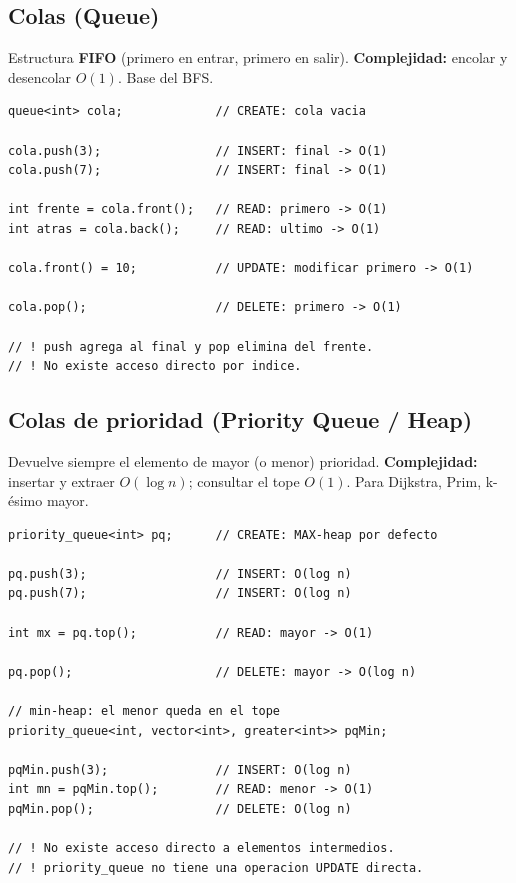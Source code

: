 \documentclass[10pt,a4paper,twocolumn]{article}
\begin{document}
\subsection{Colas (Queue)}

Estructura \textbf{FIFO} (primero en entrar, primero en salir).
\textbf{Complejidad:} encolar y desencolar $O(1)$. Base del BFS.

\begin{lstlisting}[style=cpp]
queue<int> cola;             // CREATE: cola vacia

cola.push(3);                // INSERT: final -> O(1)
cola.push(7);                // INSERT: final -> O(1)

int frente = cola.front();   // READ: primero -> O(1)
int atras = cola.back();     // READ: ultimo -> O(1)

cola.front() = 10;           // UPDATE: modificar primero -> O(1)

cola.pop();                  // DELETE: primero -> O(1)

// ! push agrega al final y pop elimina del frente.
// ! No existe acceso directo por indice.
\end{lstlisting}


\subsection{Colas de prioridad (Priority Queue / Heap)}

Devuelve siempre el elemento de mayor (o menor) prioridad.
\textbf{Complejidad:} insertar y extraer $O(\log n)$; consultar el tope
$O(1)$. Para Dijkstra, Prim, k-ésimo mayor.

\begin{lstlisting}[style=cpp]
priority_queue<int> pq;      // CREATE: MAX-heap por defecto

pq.push(3);                  // INSERT: O(log n)
pq.push(7);                  // INSERT: O(log n)

int mx = pq.top();           // READ: mayor -> O(1)

pq.pop();                    // DELETE: mayor -> O(log n)

// min-heap: el menor queda en el tope
priority_queue<int, vector<int>, greater<int>> pqMin;

pqMin.push(3);               // INSERT: O(log n)
int mn = pqMin.top();        // READ: menor -> O(1)
pqMin.pop();                 // DELETE: O(log n)

// ! No existe acceso directo a elementos intermedios.
// ! priority_queue no tiene una operacion UPDATE directa.
\end{lstlisting}
\end{document}

